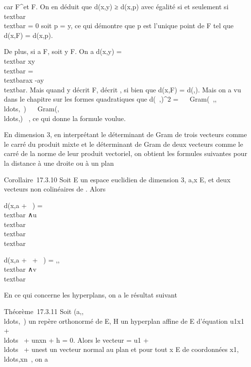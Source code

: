 car \overrightarrowxp
\in\overrightarrow F^\bot et
\overrightarrowpy \in F. On en déduit que d(x,y) ≥
d(x,p) avec égalité si et seulement
si~\\textbar{}\overrightarrowpy\\textbar{}
= 0 soit p = y, ce qui démontre que p est l'unique point de F tel que
d(x,F) = d(x,p).

De plus, si a \in F, soit y \in F. On a d(x,y)
=\\textbar{}\overrightarrow
xy\\textbar{}
=\\textbar{}\overrightarrow ax
-\overrightarrow ay\\textbar{}. Mais
quand y décrit F, \overrightarroway décrit
\overrightarrowF, si bien que d(x,F) =
d(\overrightarrowax,\overrightarrowF).
Mais on a vu dans le chapitre sur les formes quadratiques que
d(\overrightarrow\xi~,\overrightarrowF)^2
= ~
\
Gram(\overrightarrow\xi~,,\\ldots,\vecek~)
\over
{}~
\
Gram(,\\ldots,\vecek)~
, ce qui donne la formule voulue.

En dimension 3, en interprétant le déterminant de Gram de trois vecteurs
comme le carré du produit mixte et le déterminant de Gram de deux
vecteurs comme le carré de la norme de leur produit vectoriel, on
obtient les formules suivantes pour la distance à une droite ou à un
plan

Corollaire~17.3.10 Soit E un espace euclidien de dimension 3, a,x \in E,
\overrightarrowu et
\overrightarrowv deux vecteurs non colinéaires de
\overrightarrowE. Alors

d(x,a + ~\overrightarrowu) =
\\textbar{}\overrightarrowax
∧\\textbar{}
\over
\\textbar{}\overrightarrowu\\textbar{}

d(x,a + ~\overrightarrowu +
~\overrightarrowv) = \Big
\textbar{}{[}\overrightarrowax,\overrightarrowu,\overrightarrowv{]}\Big
\textbar{} \over
\\textbar{}\overrightarrowu
∧\overrightarrow v\\textbar{}

En ce qui concerne les hyperplans, on a le résultat suivant

Théorème~17.3.11 Soit
(a,,\\ldots,\vecen~)
un repère orthonormé de E, H un hyperplan affine de E d'équation
u1x1 +
\\ldots~ +
unxn + h = 0. Alors le vecteur
\overrightarrown =
u1 +
\\ldots~ +
un\vecen est un vecteur normal au
plan et pour tout x \in E de coordonnées
x1,\\ldots,xn~,
on a

